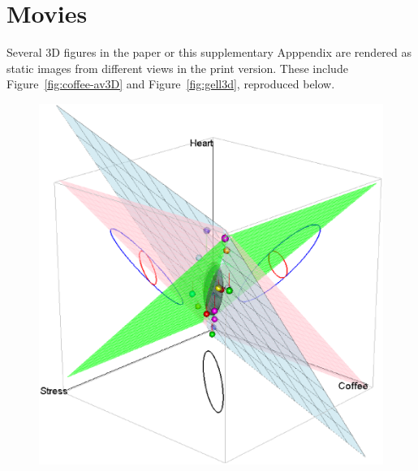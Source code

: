 \documentclass[11pt]{article}%
\newcommand*{\figref}[1]{Figure~\ref{#1}}
\begin{document}
\section{Movies}\label{sec:movies}
Several 3D figures in the paper or this supplementary Apppendix are rendered as static images from different views
in the print version.  These include \figref{fig:coffee-av3D} and \figref{fig:gell3d}, reproduced below.

\begin{figure}[htb]
 \begin{minipage}[b]{.49\linewidth}
  \centering
  \includegraphics[width=1\linewidth]{fig/coffee-av3D-1}
 \end{minipage}%
 \hfill
 \begin{minipage}[b]{.49\linewidth}
  \centering

\end{minipage}
\end{figure}
\end{document}
